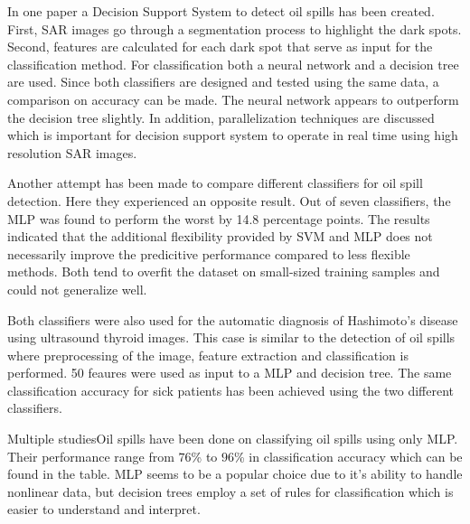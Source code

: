 In one paper a Decision Support System to detect oil spills has been created. First, SAR images go through a segmentation process to highlight the dark spots. Second, features are calculated for each dark spot that serve as input for the classification method.  For classification both a neural network and a decision tree are used. Since both classifiers are designed and tested using the same data, a comparison on accuracy can be made. The neural network appears to outperform the decision tree slightly. In addition, parallelization techniques are discussed which is important for decision support system to operate in real time using high resolution SAR images.\cite{Mera201472}
	
Another attempt has been made to compare different classifiers for oil spill detection.\cite{Xu201414} Here they experienced an opposite result. Out of seven classifiers, the MLP was found to perform the worst by 14.8 percentage points. The results indicated that the additional flexibility provided by SVM and MLP does not necessarily improve the predicitive performance compared to less flexible methods. Both tend to overfit the dataset on small-sized training samples and could not generalize well.
	
Both classifiers were also used for the automatic diagnosis of Hashimoto's disease using ultrasound thyroid images\cite{Omiotek201340}. This case is similar to the detection of oil spills where preprocessing of the image, feature extraction and classification is performed. 50 feaures were used as input to a MLP and decision tree. The same classification accuracy for sick patients has been achieved using the two different classifiers.

Multiple studies\cite{Topouzelis200762}\cite{Delfrate200038}\cite{Topouzelis200930}\cite{Topouzelis200924}Oil spills\cite{Delfrate2004} have been done on classifying oil spills using only MLP. Their performance range from $76$\% to $96$\% in classification accuracy which can be found in the table. MLP seems to be a popular choice due to it's ability to handle nonlinear data, but decision trees employ a set of rules for classification which is easier to understand and interpret.






	